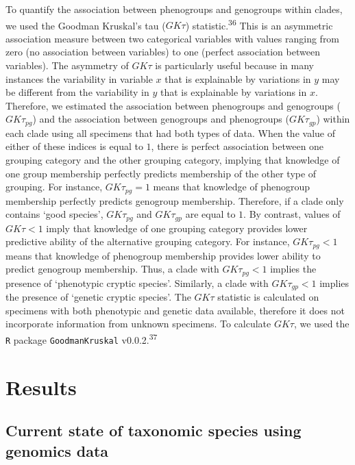 \documentclass[
  11pt,
]{article}
\begin{document}
To quantify the association between phenogroups and genogroups within clades, we used the Goodman Kruskal's tau (\(GK\tau\)) statistic.\textsuperscript{36} This is an asymmetric association measure between two categorical variables with values ranging from zero (no association between variables) to one (perfect association between variables). The asymmetry of \(GK\tau\) is particularly useful because in many instances the variability in variable \(x\) that is explainable by variations in \(y\) may be different from the variability in \(y\) that is explainable by variations in \(x\). Therefore, we estimated the association between phenogroups and genogroups (\(GK\tau_{pg}\)) and the association between genogroups and phenogroups (\(GK\tau_{gp}\)) within each clade using all specimens that had both types of data. When the value of either of these indices is equal to \(1\), there is perfect association between one grouping category and the other grouping category, implying that knowledge of one group membership perfectly predicts membership of the other type of grouping. For instance, \(GK\tau_{pg}=1\) means that knowledge of phenogroup membership perfectly predicts genogroup membership. Therefore, if a clade only contains `good species', \(GK\tau_{pg}\) and \(GK\tau_{gp}\) are equal to \(1\). By contrast, values of \(GK\tau<1\) imply that knowledge of one grouping category provides lower predictive ability of the alternative grouping category. For instance, \(GK\tau_{pg}<1\) means that knowledge of phenogroup membership provides lower ability to predict genogroup membership. Thus, a clade with \(GK\tau_{pg}<1\) implies the presence of `phenotypic cryptic species'. Similarly, a clade with \(GK\tau_{gp}<1\) implies the presence of `genetic cryptic species'. The \(GK\tau\) statistic is calculated on specimens with both phenotypic and genetic data available, therefore it does not incorporate information from unknown specimens. To calculate \(GK\tau\), we used the \texttt{R} package \texttt{GoodmanKruskal} v0.0.2.\textsuperscript{37}

\hypertarget{results}{%
\section{Results}\label{results}}

\hypertarget{current-state-of-taxonomic-species-using-genomics-data}{%
\subsection{Current state of taxonomic species using genomics data}\label{current-state-of-taxonomic-species-using-genomics-data}}
\end{document}
